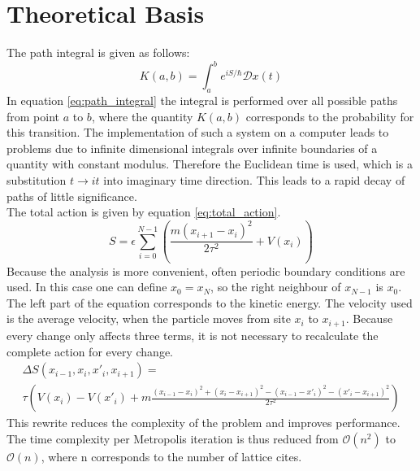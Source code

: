 \documentclass{scrartcl}
\begin{document}
	\section{Theoretical Basis}
		The path integral is given as follows:
		\begin{equation}
			K(a, b) = \int_a^b e^{iS/\hbar} \mathcal Dx(t)
			\label{eq:path_integral}
		\end{equation}
		In equation \ref{eq:path_integral} the integral is performed over all possible paths from point $a$ to $b$, where the quantity $K(a, b)$ corresponds to the probability for this transition.
		The implementation of such a system on a computer leads to problems due to infinite dimensional integrals over infinite boundaries of a quantity with constant modulus.
		Therefore the Euclidean time is used, which is a substitution $t \rightarrow i t$ into imaginary time direction.
		This leads to a rapid decay of paths of little significance.
		\\
		The total action is given by equation \ref{eq:total_action}.
		\begin{equation}
			S = \epsilon \sum_{i=0}^{N - 1} \left(\frac{m(x_{i+1} - x_i)^2}{2\tau^2} + V(x_i)\right)
			\label{eq:total_action}
		\end{equation}
		Because the analysis is more convenient, often periodic boundary conditions are used.
		In this case one can define $x_0 = x_N$, so the right neighbour of $x_{N-1}$ is $x_0$.
		The left part of the equation corresponds to the kinetic energy.
		The velocity used is the average velocity, when the particle moves from site $x_i$ to $x_{i+1}$.
		Because every change only affects three terms, it is not necessary to recalculate the complete action for every change.
		\begin{equation}
			\begin{split}
				\Delta S(x_{i-1}, x_i, x'_i, x_{i+1}) =\\
				\tau\left(V(x_i) - V(x'_i) + m\frac{(x_{i-1} - x_i)^2 + (x_i - x_{i+1})^2 - (x_{i-1} - x'_i)^2 - (x'_i - x_{i+1})^2}{2\tau^2}\right)
			\end{split}
			\label{eq:delta_total_action}
		\end{equation}
		This rewrite reduces the complexity of the problem and improves performance.
		The time complexity per Metropolis iteration is thus reduced from $\mathcal O(n^2)$ to $\mathcal O(n)$, where n corresponds to the number of lattice cites.
\end{document}
